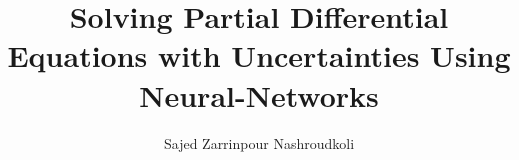 % 
% 
%
%
%
%
%
%
%
% 
% 


\title{Solving Partial Differential Equations with Uncertainties Using Neural-Networks}

\author{Sajed Zarrinpour Nashroudkoli}


